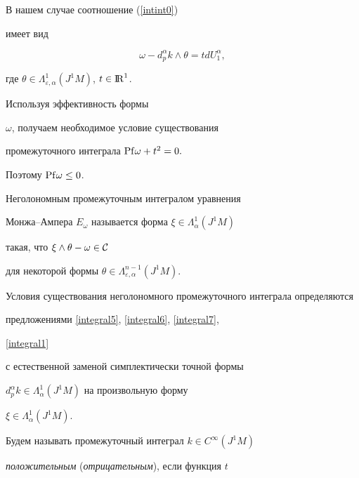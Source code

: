 \begin{pf}


В нашем случае соотношение (\ref{intint0})


имеет вид


\begin{equation}


\omega -d_p^\alpha k\wedge \theta =tdU_1^\alpha ,\label{intint2dim}


\end{equation}


где $\theta \in \Lambda_{\varepsilon ,\alpha}^1(J^1M)$, $t\in {\mathrm{I\!R}}^1$.


Используя эффективность формы 


$\omega $, получаем необходимое условие существования


промежуточного интеграла ${\operatorname{Pf}}\omega +t^2=0.$ 


Поэтому ${\operatorname{Pf}}\omega \leq 0$.


\end{pf}





\begin{note}


Неголономным промежуточным интегралом уравнения 


Монжа--Ампера $E_\omega $ называется форма $\xi\in\Lambda_\alpha^1(J^1M)$


такая, что $\xi \wedge \theta -\omega \in {\cal C}$


для некоторой формы $\theta\in\Lambda_{\varepsilon,\alpha }^{n-1}(J^1M)$.


Условия существования неголономного промежуточного интеграла определяются


предложениями \ref{integral5}, \ref{integral6}, \ref{integral7},


\ref{integral1} 


с естественной заменой симплектически точной формы 


$d_p^\alpha k \in \Lambda_\alpha^1(J^1M)$ на произвольную форму


$\xi \in \Lambda_\alpha^1(J^1M)$.


\end{note}





Будем называть промежуточный интеграл $k\in C^\infty (J^1M)$ 


{\em положительным} ({\em отрицательным}), если функция $t$ 



